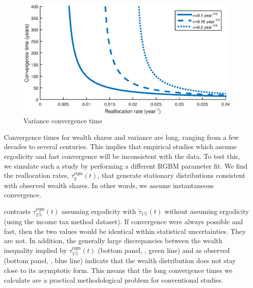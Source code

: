 \begin{figure}[!htb]
\centering
\includegraphics[width=1.0\textwidth] {./chapter_3/figs/variance_convergence.eps}
\caption{Variance convergence time}
\end{figure}


Convergence times for wealth shares and variance are long, ranging from a few decades to several centuries. This implies that empirical studies which assume ergodicity and fast convergence will be inconsistent with the data. To test this, we simulate such a study by performing a different RGBM parameter fit. We find the reallocation rates, $\tau^\text{eqm}_q\left(t\right)$, that generate stationary distributions consistent with observed wealth shares. In other words, we assume instantaneous convergence.

 contrasts $\tau^\text{eqm}_{1\%}\left(t\right)$ assuming ergodicity with $\widetilde{\tau}_{1\%}\left(t\right)$ without assuming ergodicity (using the income tax method dataset). If convergence were always possible and fast, then the two values would be identical within statistical uncertainties. They are not. In addition, the generally large discrepancies between the wealth inequality implied by $\tau^\text{eqm}_{1\%}\left(t\right)$ (bottom panel, , green line) and as observed (bottom panel, , blue line) indicate that the wealth distribution does not stay close to its asymptotic form. This means that the long convergence times we calculate are a practical methodological problem for conventional studies.

